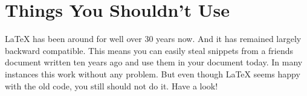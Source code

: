 %
%
%
%

\chapter{Things You Shouldn't Use}

\begin{intro}
  \LaTeX{} has been around for well over 30 years now. And it has remained
  largely backward compatible. This means you can easily steal snippets from
  a friends document written ten years ago and use them in your document today.
  In many instances this work without any problem. But even though \LaTeX{} seems happy
  with the old code, you still should not do it. Have a look!
\end{intro}

\begingroup
\ExplSyntaxOn
{}

